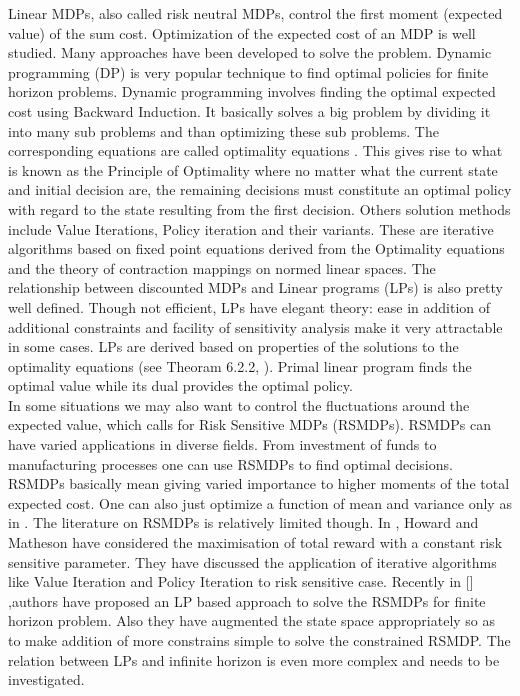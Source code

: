 \documentclass[11pt,a4paper,oneside]{report}
\begin{document}
\noindent Linear MDPs, also called risk neutral MDPs, control the first moment (expected value) of the sum cost. Optimization of the expected cost of an MDP is well studied. Many approaches have been developed to solve the problem. Dynamic programming (DP) is very popular technique to find optimal policies for finite horizon problems. Dynamic programming involves finding the optimal expected cost using Backward Induction. It basically solves a big problem by dividing it into many sub problems and than optimizing these sub problems. The corresponding equations are called optimality equations \citep{puterman1990market}. This gives rise to what is known as the Principle of Optimality where no matter what the current state and initial decision are, the remaining decisions must constitute an optimal policy with regard to the state resulting from the first decision. Others solution methods include Value Iterations, Policy iteration and their variants. These are iterative algorithms based on fixed point equations derived from the Optimality equations and the theory of contraction mappings on normed linear spaces. The relationship between discounted MDPs and Linear programs (LPs) is also pretty well defined. Though not efficient, LPs have elegant theory: ease in addition of additional constraints and facility of sensitivity analysis make it very attractable in some cases. LPs are derived based on properties of the solutions to the optimality equations (see Theoram 6.2.2, \cite{puterman1990market}). Primal linear program finds the optimal value while its dual provides the optimal policy.\\


In some situations we may also want to control the fluctuations around the expected value, which calls for Risk Sensitive MDPs (RSMDPs). RSMDPs can have varied applications in diverse fields. From investment of funds to manufacturing processes one can use RSMDPs to find optimal decisions. RSMDPs basically mean giving varied importance to higher moments of the total expected cost. One can also just optimize a function of mean and variance only as in \citep{mannor2011mean}.  The literature on RSMDPs is relatively limited though. In \cite{howard1972risk}, Howard and Matheson have considered the maximisation of total reward with a constant risk sensitive parameter. They have discussed the application of iterative algorithms like Value Iteration and Policy Iteration to risk sensitive case. Recently in [\citep{kumar2015finite}] ,authors have proposed an LP based approach to solve the RSMDPs for finite horizon problem. Also they have augmented the state space appropriately so as to make addition of more constrains simple to solve the constrained RSMDP. The relation between LPs and infinite horizon is even more complex and needs to be investigated.\\ 
\end{document}
